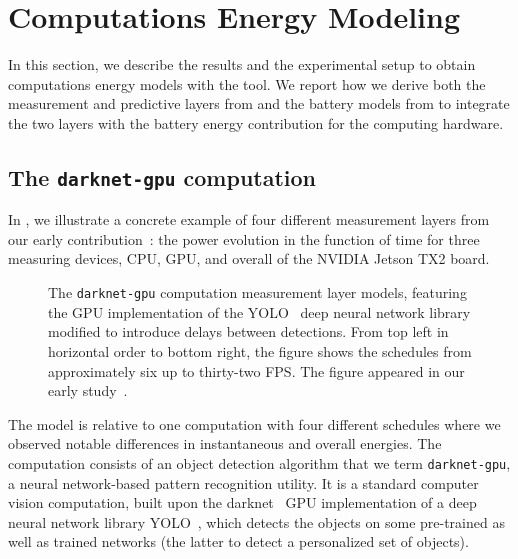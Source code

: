 \section{Computations Energy Modeling}
\label{sec:res-ene-comps}

In this section, we describe the results and the experimental setup to obtain computations energy models with the \powprof{} tool. We report how we derive both the measurement and predictive layers from  and the battery models from  to integrate the two layers with the battery energy contribution for the computing hardware.

\subsection{The {\tt darknet-gpu} computation}
\label{sec:res-darknet-gpu}

In , we illustrate a concrete example of four different measurement layers from our early contribution~\citep{seewald2019coarse}: the power evolution in the function of time for three measuring devices, CPU, GPU, and overall of the NVIDIA Jetson TX2 board. 
\begin{figure}[h!]
  \begin{minipage}{.93\textwidth}
  \centering
  \selectfont
  \hspace*{20ex}
  
  \end{minipage}
  \sfr
  \caption[The {\tt darknet-gpu} computation measurement layer models]{The {\tt darknet-gpu} computation measurement layer models, featuring the GPU implementation of the YOLO~\citep{redmon2016you} deep neural network library modified to introduce delays between detections. From top left in horizontal order to bottom right, the figure shows the schedules from approximately six up to thirty-two FPS. The figure appeared in our early study~\citep{seewald2019coarse}.}
  \label{fig:darknet-layer1}
  \efr
\end{figure}
The model is relative to one computation with four different schedules where we observed notable differences in instantaneous and overall energies. The computation consists of an object detection algorithm that we term {\small\tt darknet-gpu}, a neural network-based pattern recognition utility. It is a standard computer vision computation, built upon the darknet~\citep{redmond2017yolo,redomnd2013darknet} GPU implementation of a deep neural network library YOLO~\citep{redmon2016you}, which detects the objects on some pre-trained as well as trained networks (the latter to detect a personalized set of objects).

